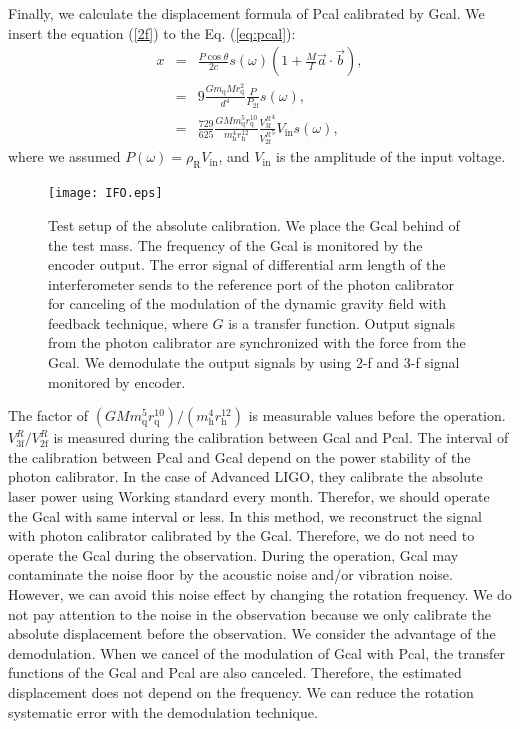 \documentclass[A4]{spie}  %
\begin{document}
Finally, we calculate the displacement formula of Pcal calibrated by Gcal. We insert the equation (\ref{2f}) to the Eq. (\ref{eq:pcal}):
\begin{eqnarray}
x&=&\frac{P \cos{\theta}}{2c} s(\omega)\left(1+\frac{M}{I}\vec{a} \cdot \vec{b} \right), \\
 &=&9\frac{Gm_{\mathrm{q}} M r_{\mathrm{q}}^2}{d^4}\frac{P}{P_{\mathrm{2f}}}s(\omega) , \\
 &=&\frac{729}{625} \frac{GM m^5_{\mathrm{q}} r_{\mathrm{q}}^{10}}{m^4_{\mathrm{h}} r_{\mathrm{h}}^{12} } \frac{{V_{\mathrm{3f}}^{R}}^4}{{V_{\mathrm{2f}}^{R}}^5}V_{\mathrm{in}} s(\omega)  , \label{pcal_new}
\end{eqnarray}
where we assumed $P(\omega)=\rho_{\mathrm{R}} V_{\mathrm{in}}$, and $V_{\mathrm{in}}$ is the amplitude of the input voltage.
\begin{figure}
\begin{center}
\texttt{[image: IFO.eps]}
\caption{Test setup of the absolute calibration. We place the Gcal behind of the test mass. The frequency of the Gcal is monitored by the encoder output. The error signal of differential arm length of the interferometer sends to the reference port of the photon calibrator for canceling of the modulation of the dynamic gravity field with feedback technique, where $G$ is a transfer function. Output signals from the photon calibrator are synchronized with the force from the Gcal. We demodulate the output signals by using 2-f and 3-f signal monitored by encoder.}
\label{fig:IFO}
\end{center}
\end{figure}
The factor of $(GMm_{\mathrm{q}}^5 r_{\mathrm{q}}^{10})/(m_{\mathrm{h}}^4 r_{\mathrm{h}}^{12})$ is measurable values before the operation.  $V^R_{\mathrm{3f}}/V^R_{\mathrm{2f}}$ is measured during the calibration between Gcal and Pcal. The interval of the calibration between Pcal and Gcal depend on the power stability of the photon calibrator. In the case of Advanced LIGO, they calibrate the absolute laser power using Working standard every month. Therefor, we should operate the Gcal with same interval or less. In this method, we reconstruct the signal with photon calibrator calibrated by the Gcal.  Therefore, we do not need to operate the Gcal during the observation.
During the operation, Gcal may contaminate the noise floor by the acoustic noise and/or vibration noise. However, we can avoid this noise effect by changing the rotation frequency. We do not pay attention to the noise in the observation because we only calibrate the absolute displacement before the observation.
We consider the advantage of the demodulation. When we cancel of the modulation of Gcal with Pcal, the transfer functions of the Gcal and Pcal are also canceled. Therefore, the estimated displacement does not depend on the frequency. We can reduce the rotation systematic error with the demodulation technique.
\end{document}
